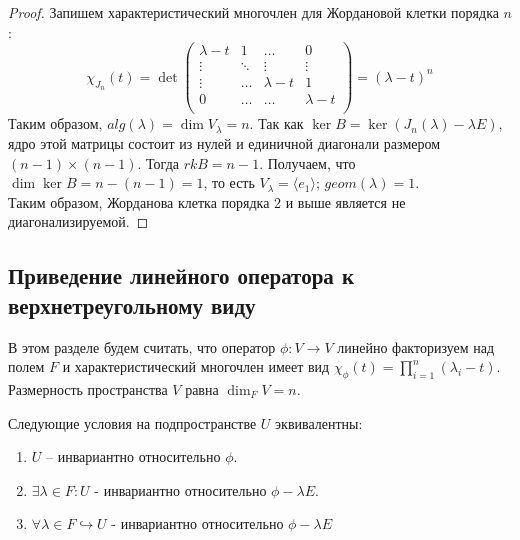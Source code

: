 \begin{proof}
    Запишем характеристический многочлен для Жордановой клетки порядка $n$:
    \begin{equation*}
    \chi_{J_n}(t) = \det
        \left(
            \begin{array}{cccc}
            \lambda - t & 1 & \dots & 0 \\
            \vdots & \ddots & \vdots & \vdots \\
            \vdots & \dots & \lambda - t & 1 \\
            0 & \dots & \dots & \lambda - t \\
            \end{array}
        \right) = (\lambda - t)^n
    \end{equation*}
    Таким образом, $alg(\lambda) = \dim V_{\lambda} = n$. Так как $\ker B = \ker (J_n(\lambda) - \lambda E)$, 
    ядро этой матрицы состоит из нулей и единичной диагонали размером $(n - 1) \times (n - 1)$. 
    Тогда $rk B = n - 1$. Получаем, что $\dim \ker B = n - (n - 1) = 1$, то есть 
    $V_{\lambda} = \langle e_1 \rangle$; $geom(\lambda) = 1$. \\
    Таким образом, Жорданова клетка порядка 2 и выше является не диагонализируемой.
\end{proof}

\subsection{Приведение линейного оператора к верхнетреугольному виду}

\begin{agreement}
    В этом разделе будем считать, что оператор $\phi: V \to V$ линейно факторизуем над полем $F$ и 
    характеристический многочлен имеет вид $\chi_{\phi}(t) = \prod_{i=1}^n (\lambda_i - t)$.
    Размерность пространства $V$ равна $\dim_F V = n$.
\end{agreement}

\begin{proposition}
    \label{prop4.2}
    Следующие условия на подпространстве $U$ эквивалентны:
    \begin{enumerate}
        \item $U$ -- инвариантно относительно $\phi$.
        \item $\exists \lambda \in F: U$ - инвариантно относительно $\phi - \lambda E$.
        \item  $\forall \lambda \in F \hookrightarrow U$ - инвариантно относительно $\phi - \lambda E$
    \end{enumerate}
\end{proposition}

